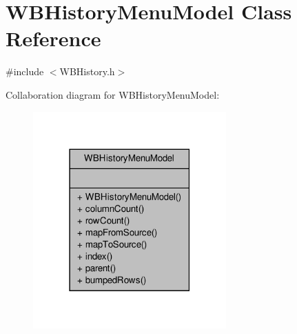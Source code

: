 \hypertarget{class_w_b_history_menu_model}{\section{W\-B\-History\-Menu\-Model Class Reference}
\label{d2/de6/class_w_b_history_menu_model}
}


{\ttfamily \#include $<$W\-B\-History.\-h$>$}



Collaboration diagram for W\-B\-History\-Menu\-Model\-:
\nopagebreak
\begin{figure}[H]
\begin{center}
\leavevmode
\includegraphics[width=210pt]{d5/db0/class_w_b_history_menu_model__coll__graph}
\end{center}
\end{figure}
